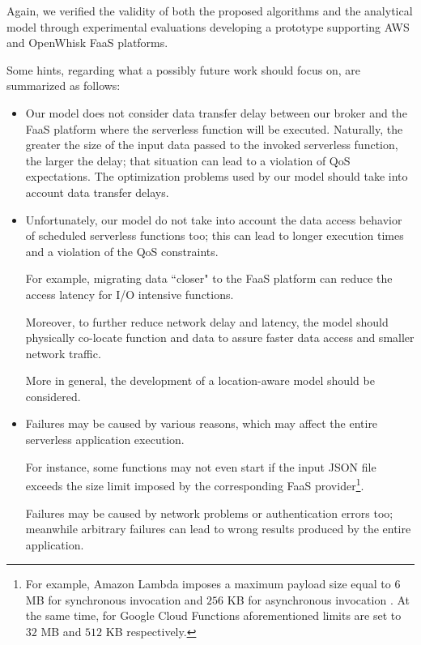 \documentclass[12pt,a4paper]{report}
\newcommand{\QuoteIntro}{``}
\begin{document}
Again, we verified the validity of both the proposed algorithms and the analytical model through experimental evaluations developing a prototype supporting AWS and OpenWhisk FaaS platforms.

Some hints, regarding what a possibly future work should focus on, are summarized as follows:

\begin{itemize}
	
	\item Our model does not consider data transfer delay between our broker and the FaaS platform where the serverless function will be executed. Naturally, the greater the size of the input data passed to the invoked serverless function, the larger the delay; that situation can lead to a violation of QoS expectations. The optimization problems used by our model should take into account data transfer delays.
	
	\item Unfortunately, our model do not take into account the data access behavior of scheduled serverless functions too; this can lead to longer execution times and a violation of the QoS constraints. 
	
	For example, migrating data \QuoteIntro closer" to the FaaS platform can  reduce the access latency for I/O intensive functions. 
	
	Moreover, to further reduce network delay and latency, the model should physically co-locate function and data to assure faster data access and smaller network traffic.
	
	More in general, the development of a location-aware model should be considered.
	 
	\item Failures may be caused by various reasons, which may affect the entire serverless application execution. 
	
	For instance, some functions may not even start if the input JSON file exceeds the size limit imposed by the corresponding FaaS provider\footnote{For example, Amazon Lambda imposes a maximum payload size equal to $6$ MB for synchronous invocation and $256$ KB for asynchronous invocation \cite{Lambdaquotas}. At the same time, for Google Cloud Functions aforementioned limits are set to $32$ MB and $512$ KB respectively.\cite{Googlequotas}}. 
	
	Failures may be caused by network problems or authentication errors too; meanwhile arbitrary failures can lead to wrong results produced by the entire application.
	

\end{itemize}
\end{document}
